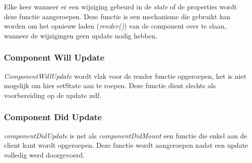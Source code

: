 		Elke keer wanneer er een wijziging gebeurd in de \emph{state} of de properties wordt deze functie aangeroepen. Deze functie is een mechanisme die gebruikt kan worden om het opnieuw laden (\emph{render()}) van de component over te slaan, wanneer de wijzigingen geen update nodig hebben.
	
	\subsubsection{Component Will Update}
		
		\emph{ComponentWillUpdate} wordt vlak voor de render functie opgeroepen, het is niet mogelijk om hier setState aan te roepen. Deze functie dient slechts als voorbereiding op de update zelf.
	
	\subsubsection{Component Did Update}
		
		\emph{componentDidUpdate} is net als \emph{componentDidMount} een functie die enkel aan de client kant wordt opgeroepen. Deze functie wordt aangeroepen nadat een update volledig werd doorgevoerd.
		
